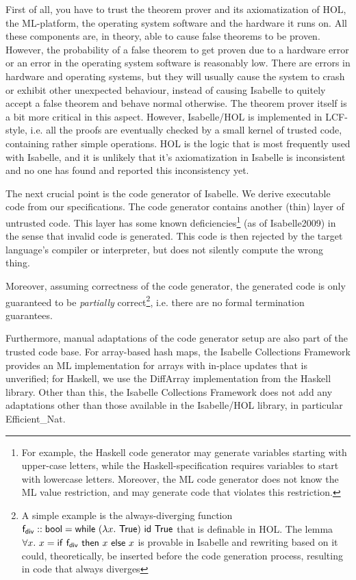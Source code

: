   First of all, you have to trust the theorem prover and its axiomatization of HOL, the ML-platform, the operating system software and the hardware it runs on.
  All these components are, in theory, able to cause false theorems to be proven. However, the probability of a false theorem to get proven due to a hardware error 
  or an error in the operating system software is reasonably low. There are errors in hardware and operating systems, but they will usually cause the system to crash 
  or exhibit other unexpected behaviour, instead of causing Isabelle to quitely accept a false theorem and behave normal otherwise. The theorem prover itself is a bit more critical in this aspect. However, Isabelle/HOL is implemented in LCF-style, i.e. all the proofs are eventually checked by a small kernel of trusted code, containing rather simple operations. HOL is the logic that is most frequently used with Isabelle, and it is unlikely that it's axiomatization in Isabelle is inconsistent and no one has found and reported this inconsistency yet.

  The next crucial point is the code generator of Isabelle. We derive executable code from our specifications. The code generator contains another (thin) layer of untrusted code. This layer has some known deficiencies\footnote{For example, the Haskell code generator may generate variables starting with upper-case letters, while the Haskell-specification requires variables to start with lowercase letters. Moreover, the ML code generator does not know the ML value restriction, and may generate code that violates this restriction.} (as of Isabelle2009) in the sense that invalid code is generated. This code is then rejected by the target language's compiler or interpreter, but does not silently compute the wrong thing. 

  Moreover, assuming correctness of the code generator, the generated code is only guaranteed to be {\em partially} correct\footnote{A simple example is the always-diverging function ${\sf f_{div}}::{\sf bool} = {\sf while}~(\lambda x.~{\sf True})~{\sf id}~{\sf True}$ that is definable in HOL. The lemma $\forall x.~ x = {\sf if}~{\sf f_{div}}~{\sf then}~x~{\sf else}~x$ is provable in Isabelle and rewriting based on it could, theoretically, be inserted before the code generation process, resulting in code that always diverges}, i.e. there are no formal termination guarantees.

  Furthermore, manual adaptations of the code generator setup are also part of the trusted code base.
  For array-based hash maps, the Isabelle Collections Framework provides an ML implementation for arrays with in-place updates that is unverified; for Haskell, we use the DiffArray implementation from the Haskell library.
  Other than this, the Isabelle Collections Framework does not add any adaptations other than those available in the Isabelle/HOL library, in particular Efficient\_Nat.

